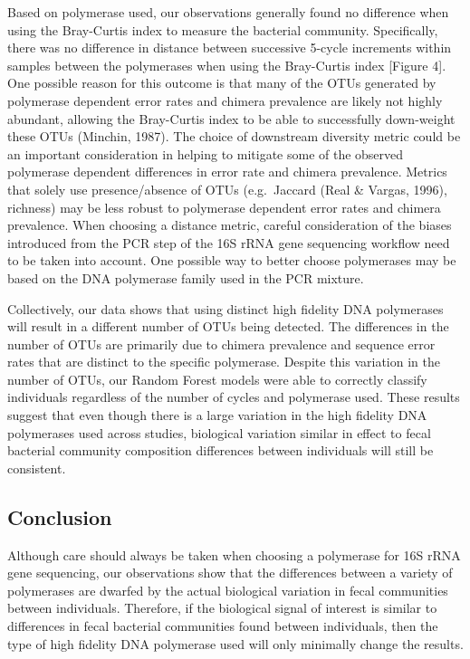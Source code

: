 \documentclass[11pt,]{article}
\begin{document}
Based on polymerase used, our observations generally found no difference
when using the Bray-Curtis index to measure the bacterial community.
Specifically, there was no difference in distance between successive
5-cycle increments within samples between the polymerases when using the
Bray-Curtis index {[}Figure 4{]}. One possible reason for this outcome
is that many of the OTUs generated by polymerase dependent error rates
and chimera prevalence are likely not highly abundant, allowing the
Bray-Curtis index to be able to successfully down-weight these OTUs
(Minchin, 1987). The choice of downstream diversity metric could be an
important consideration in helping to mitigate some of the observed
polymerase dependent differences in error rate and chimera prevalence.
Metrics that solely use presence/absence of OTUs (e.g.~Jaccard (Real \&
Vargas, 1996), richness) may be less robust to polymerase dependent
error rates and chimera prevalence. When choosing a distance metric,
careful consideration of the biases introduced from the PCR step of the
16S rRNA gene sequencing workflow need to be taken into account. One
possible way to better choose polymerases may be based on the DNA
polymerase family used in the PCR mixture.

Collectively, our data shows that using distinct high fidelity DNA
polymerases will result in a different number of OTUs being detected.
The differences in the number of OTUs are primarily due to chimera
prevalence and sequence error rates that are distinct to the specific
polymerase. Despite this variation in the number of OTUs, our Random
Forest models were able to correctly classify individuals regardless of
the number of cycles and polymerase used. These results suggest that
even though there is a large variation in the high fidelity DNA
polymerases used across studies, biological variation similar in effect
to fecal bacterial community composition differences between individuals
will still be consistent.

\newpage

\subsection{Conclusion}\label{conclusion}

Although care should always be taken when choosing a polymerase for 16S
rRNA gene sequencing, our observations show that the differences between
a variety of polymerases are dwarfed by the actual biological variation
in fecal communities between individuals. Therefore, if the biological
signal of interest is similar to differences in fecal bacterial
communities found between individuals, then the type of high fidelity
DNA polymerase used will only minimally change the results.
\end{document}
